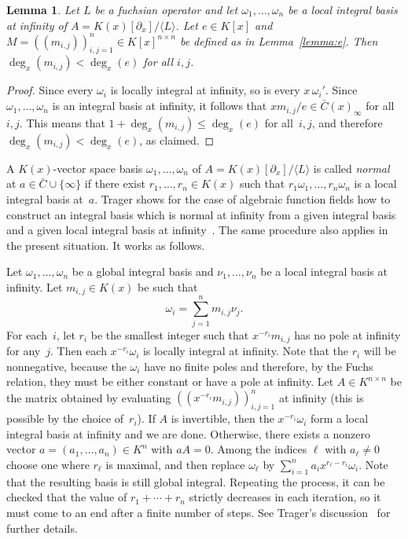 \documentclass{sig-alternate}
\newtheorem{lemma}[theorem]{Lemma}
\def\<#1>{\langle#1\rangle}
\begin{document}
\begin{lemma} \label{lemma:degM}
  Let $L$ be a fuchsian operator and let $\omega_1,\dots,\omega_n$ be a local integral
  basis at infinity of $A=K(x)[\partial_x]/\<L>$. Let $e\in K[x]$ and $M=((m_{i,j}))_{i,j=1}^n\in K[x]^{n\times n}$
  be defined as in Lemma~\ref{lemma:e}. Then $\deg_x(m_{i,j})<\deg_x(e)$ for all $i,j$.
\end{lemma}
\begin{proof}
  Since every $\omega_i$ is locally integral at infinity, so is every $x\,\omega_i'$.
  Since $\omega_1,\dots,\omega_n$ is an integral basis at infinity, it follows that
  $xm_{i,j}/e\in\bar C(x)_\infty$ for all~$i,j$. This means that $1+\deg_x(m_{i,j})\leq\deg_x(e)$
  for all~$i,j$, and therefore $\deg_x(m_{i,j})<\deg_x(e)$, as claimed.
\end{proof}

A $K(x)$-vector space basis $\omega_1,\dots,\omega_n$ of $A=K(x)[\partial_x]/\<L>$ is
called \emph{normal} at $a\in\bar C\cup\{\infty\}$ if there exist $r_1,\dots,r_n\in
K(x)$ such that $r_1\omega_1,\dots,r_n\omega_n$ is a local integral basis
at~$a$. Trager shows for the case of algebraic function fields how to construct
an integral basis which is normal at infinity from a given integral basis and
a given local integral basis at infinity~\cite{trager84}. The same procedure also applies
in the present situation. It works as follows.

Let $\omega_1,\dots,\omega_n$ be a global integral basis and $\nu_1,\dots,\nu_n$ be a local
integral basis at infinity. Let $m_{i,j}\in K(x)$ be such that
\[
 \omega_i = \sum_{j=1}^n m_{i,j}\nu_j.
\]
For each~$i$, let $r_i$ be the smallest integer such that $x^{-r_i}m_{i,j}$ has no pole at infinity for any~$j$.
Then each $x^{-r_i}\omega_i$ is locally integral at infinity.
Note that the $r_i$ will be nonnegative, because the $\omega_i$ have no finite poles and therefore,
by the Fuchs relation, they must be either constant or have a pole at infinity.
Let $A\in K^{n\times n}$ be the matrix obtained by evaluating $((x^{-r_i}m_{i,j}))_{i,j=1}^n$ at infinity
(this is possible by the choice of~$r_i$).
If $A$ is invertible, then the $x^{-r_i}\omega_i$ form a local integral basis at infinity and we are done.
Otherwise, there exists a nonzero vector $a=(a_1,\dots,a_n)\in K^n$ with $aA=0$.
Among the indices $\ell$ with $a_\ell\neq0$ choose one where $r_\ell$ is maximal, %
and then replace $\omega_\ell$ by $\sum_{i=1}^n a_i x^{r_\ell-r_i}\omega_i$.
Note that the resulting basis is still global integral.
Repeating the process, it can be checked that the value of $r_1+\cdots+r_n$ strictly decreases in each iteration,
so it must come to an end after a finite number of steps.
See Trager's discussion~\cite{trager84} for further details.
\end{document}
